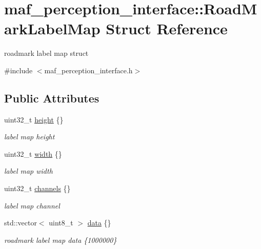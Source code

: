 \hypertarget{structmaf__perception__interface_1_1RoadMarkLabelMap}{}\section{maf\+\_\+perception\+\_\+interface\+:\+:Road\+Mark\+Label\+Map Struct Reference}
\label{structmaf__perception__interface_1_1RoadMarkLabelMap}


roadmark label map struct  




{\ttfamily \#include $<$maf\+\_\+perception\+\_\+interface.\+h$>$}

\subsection*{Public Attributes}
\begin{DoxyCompactItemize}
\item 
uint32\+\_\+t \hyperlink{structmaf__perception__interface_1_1RoadMarkLabelMap_ab8a7f9175621d807d438f17588c11a45}{height} \{\}
\begin{DoxyCompactList}\small\item\em label map height \end{DoxyCompactList}\item 
uint32\+\_\+t \hyperlink{structmaf__perception__interface_1_1RoadMarkLabelMap_a5b7304d96231ec04f6c59dcc944f3170}{width} \{\}
\begin{DoxyCompactList}\small\item\em label map width \end{DoxyCompactList}\item 
uint32\+\_\+t \hyperlink{structmaf__perception__interface_1_1RoadMarkLabelMap_abf7c33e41281fb937b07bc418ec07d6f}{channels} \{\}
\begin{DoxyCompactList}\small\item\em label map channel \end{DoxyCompactList}\item 
std\+::vector$<$ uint8\+\_\+t $>$ \hyperlink{structmaf__perception__interface_1_1RoadMarkLabelMap_ae40c958a909c6aa4c372ccec57ee89e8}{data} \{\}
\begin{DoxyCompactList}\small\item\em roadmark label map data \{1000000\} \end{DoxyCompactList}\end{DoxyCompactItemize}


